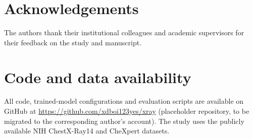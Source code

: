 \documentclass[pdflatex,sn-nature]{sn-jnl}
\begin{document}
\section*{Acknowledgements}

The authors thank their institutional colleagues and academic supervisors for their feedback on the study and manuscript.

\section*{Code and data availability}

All code, trained-model configurations and evaluation scripts are available on GitHub at \url{https://github.com/xdboi123yes/xray} (placeholder repository, to be migrated to the corresponding author's account). The study uses the publicly available NIH ChestX-Ray14 \cite{wang2017chestxray} and CheXpert \cite{irvin2019chexpert} datasets.
\end{document}

